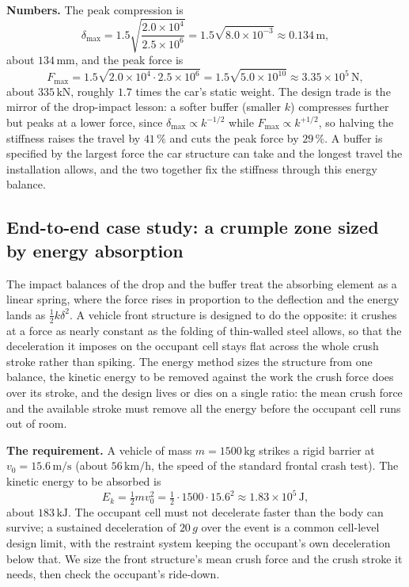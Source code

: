 \textbf{Numbers.} The peak compression is
\[
\delta_\text{max} = 1.5\sqrt{\frac{2.0\times 10^{4}}{2.5\times 10^{6}}}
= 1.5\sqrt{8.0\times 10^{-3}}
\approx 0.134\,\si{\meter},
\]
about $134\,\si{\milli\meter}$, and the peak force is
\[
F_\text{max} = 1.5\sqrt{2.0\times 10^{4}\cdot 2.5\times 10^{6}}
= 1.5\sqrt{5.0\times 10^{10}}
\approx 3.35\times 10^{5}\,\si{\newton},
\]
about $335\,\si{\kilo\newton}$, roughly $1.7$ times the car's static weight.
The design trade is the mirror of the drop-impact lesson: a softer buffer
(smaller $k$) compresses further but peaks at a lower force, since
$\delta_\text{max} \propto k^{-1/2}$ while $F_\text{max}\propto k^{+1/2}$, so
halving the stiffness raises the travel by $41\,\%$ and cuts the peak force
by $29\,\%$. A buffer is specified by the largest force the car structure can
take and the longest travel the installation allows, and the two together
fix the stiffness through this energy balance.

\subsection{End-to-end case study: a crumple zone sized by energy
absorption}

The impact balances of the drop and the buffer treat the absorbing element
as a linear spring, where the force rises in proportion to the deflection
and the energy lands as $\tfrac12 k\delta^2$. A vehicle front structure is
designed to do the opposite: it crushes at a force as nearly constant as
the folding of thin-walled steel allows, so that the deceleration it
imposes on the occupant cell stays flat across the whole crush stroke
rather than spiking. The energy method sizes the structure from one
balance, the kinetic energy to be removed against the work the crush force
does over its stroke, and the design lives or dies on a single ratio: the
mean crush force and the available stroke must remove all the energy before
the occupant cell runs out of room.

\textbf{The requirement.} A vehicle of mass $m = 1500\,\si{\kilogram}$
strikes a rigid barrier at $v_0 = 15.6\,\si{\meter\per\second}$
(about $56\,\si{\kilo\meter\per\hour}$, the speed of the standard frontal
crash test). The kinetic energy to be absorbed is
\[
E_k = \tfrac12 m v_0^2 = \tfrac12 \cdot 1500 \cdot 15.6^2
\approx 1.83\times 10^{5}\,\si{\joule},
\]
about $183\,\si{\kilo\joule}$. The occupant cell must not decelerate faster
than the body can survive; a sustained deceleration of $20\,g$ over the
event is a common cell-level design limit, with the restraint system
keeping the occupant's own deceleration below that. We size the front
structure's mean crush force and the crush stroke it needs, then check the
occupant's ride-down.

